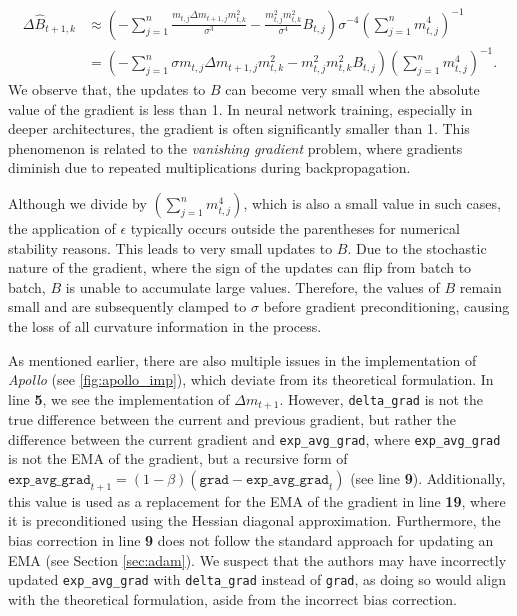\begin{align*}
    \Delta \hat{B}_{t+1,k} &\approx \left(-\sum_{j=1}^{n} \frac{m_{t,j} \Delta m_{t+1,j} m_{t,k}^2}{\sigma^3}  - \frac{m_{t,j}^2m_{t,k}^2}{\sigma^4} B_{t,j}  \right) \sigma^{-4} \left(\sum_{j=1}^{n} m_{t,j}^{4} \right)^{-1}\\
    &=  \left(-\sum_{j=1}^{n} \sigma m_{t,j} \Delta m_{t+1,j} m_{t,k}^2  - m_{t,j}^2m_{t,k}^2 B_{t,j} \right)  \left(\sum_{j=1}^{n} m_{t,j}^{4} \right)^{-1}.
\end{align*}
We observe that, the updates to $B$ can become very small when
the absolute value of the gradient is less than 1. In neural network training, especially in deeper architectures,
the gradient is often significantly smaller than 1. This phenomenon is related to the \emph{vanishing gradient}
problem, where gradients diminish due to repeated multiplications during backpropagation. 


Although we divide by $\left(\sum_{j=1}^{n} m_{t,j}^{4} \right)$,
which is also a small value in such cases, the application of $\epsilon$ typically occurs outside the parentheses for numerical stability reasons.
This leads to very small updates to $B$. Due to the stochastic nature of the gradient, where the sign of the updates can flip from batch to batch,
$B$ is unable to accumulate large values. Therefore, the values of $B$ remain small and are subsequently clamped to $\sigma$ before gradient preconditioning,
causing the loss of all curvature information in the process.

As mentioned earlier, there are also multiple issues in the implementation of \emph{Apollo} (see \ref{fig:apollo_imp}),
which deviate from its theoretical formulation. In line \textbf{5}, we see the implementation of $\Delta m_{t+1}$.
However, \texttt{delta\_grad} is not the true difference between the current and previous gradient,
but rather the difference between the current gradient and \texttt{exp\_avg\_grad}, where \texttt{exp\_avg\_grad}
is not the EMA of the gradient, but a recursive form of $\texttt{exp\_avg\_grad}_{t+1} = (1-\beta) (\texttt{grad} - \texttt{exp\_avg\_grad}_{t})$ (see line \textbf{9}).
Additionally, this value is used as a replacement for the EMA of the gradient in line \textbf{19},
where it is preconditioned using the Hessian diagonal approximation.
Furthermore, the bias correction in line \textbf{9} does not follow the standard approach for updating an EMA (see Section \ref{sec:adam}).
We suspect that the authors may have incorrectly updated \texttt{exp\_avg\_grad} with \texttt{delta\_grad} instead of \texttt{grad},
as doing so would align with the theoretical formulation, aside from the incorrect bias correction.

